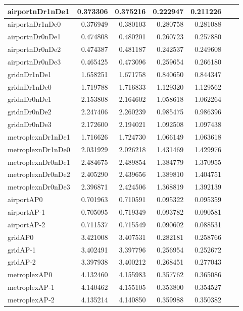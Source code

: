 \documentclass[../../../thesis.tex]{subfiles}
\begin{document}
\begin{longtable}{|l|r|r|r|r|r|r|}
\endlastfoot
airportnDr1nDe1 & 0.373306 & 0.375216 & 0.222947 & 0.211226 \\ \hline
airportnDr1nDe0 & 0.376949 & 0.380103 & 0.280758 & 0.281088 \\ \hline
airportnDr0nDe1 & 0.474808 & 0.480201 & 0.260723 & 0.257880 \\ \hline
airportnDr0nDe2 & 0.474387 & 0.481187 & 0.242537 & 0.249608 \\ \hline
airportnDr0nDe3 & 0.465425 & 0.473096 & 0.259654 & 0.266180 \\ \hline
gridnDr1nDe1 & 1.658251 & 1.671758 & 0.840650 & 0.844347 \\ \hline
gridnDr1nDe0 & 1.719788 & 1.716833 & 1.129320 & 1.129562 \\ \hline
gridnDr0nDe1 & 2.153808 & 2.164602 & 1.058618 & 1.062264 \\ \hline
gridnDr0nDe2 & 2.247406 & 2.260239 & 0.985475 & 0.986396 \\ \hline
gridnDr0nDe3 & 2.172600 & 2.194021 & 1.092508 & 1.097438 \\ \hline
metroplexnDr1nDe1 & 1.716626 & 1.724730 & 1.066149 & 1.063618 \\ \hline
metroplexnDr1nDe0 & 2.031929 & 2.026218 & 1.431469 & 1.429976 \\ \hline
metroplexnDr0nDe1 & 2.484675 & 2.489854 & 1.384779 & 1.370955 \\ \hline
metroplexnDr0nDe2 & 2.405290 & 2.439656 & 1.389810 & 1.404751 \\ \hline
metroplexnDr0nDe3 & 2.396871 & 2.424506 & 1.368819 & 1.392139 \\ \hline
airportAP0 & 0.701963 & 0.710591 & 0.095322 & 0.095359 \\ \hline
airportAP-1 & 0.705095 & 0.719349 & 0.093782 & 0.090581 \\ \hline
airportAP-2 & 0.711537 & 0.715549 & 0.090602 & 0.088531 \\ \hline
gridAP0 & 3.421008 & 3.407531 & 0.282181 & 0.258766 \\ \hline
gridAP-1 & 3.402491 & 3.397796 & 0.256954 & 0.252672 \\ \hline
gridAP-2 & 3.397938 & 3.400212 & 0.268451 & 0.277043 \\ \hline
metroplexAP0 & 4.132460 & 4.155983 & 0.357762 & 0.365086 \\ \hline
metroplexAP-1 & 4.140462 & 4.155105 & 0.353800 & 0.354527 \\ \hline
metroplexAP-2 & 4.135214 & 4.140850 & 0.359988 & 0.350382 \\ \hline

\end{longtable}
\end{document}

